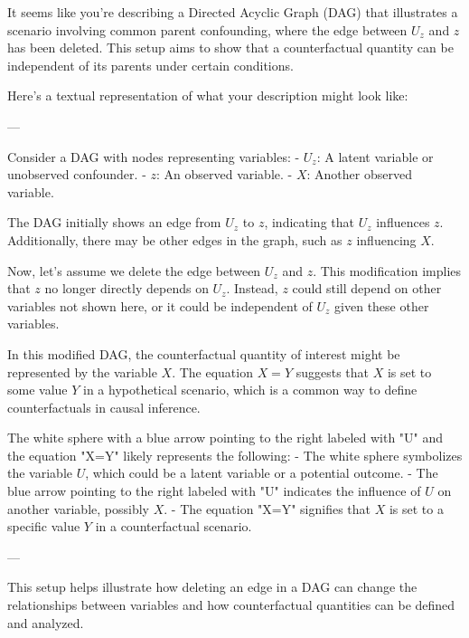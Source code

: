 It seems like you're describing a Directed Acyclic Graph (DAG) that illustrates a scenario involving common parent confounding, where the edge between \( U_z \) and \( z \) has been deleted. This setup aims to show that a counterfactual quantity can be independent of its parents under certain conditions.

Here's a textual representation of what your description might look like:

---

Consider a DAG with nodes representing variables:
- \( U_z \): A latent variable or unobserved confounder.
- \( z \): An observed variable.
- \( X \): Another observed variable.

The DAG initially shows an edge from \( U_z \) to \( z \), indicating that \( U_z \) influences \( z \). Additionally, there may be other edges in the graph, such as \( z \) influencing \( X \).

Now, let's assume we delete the edge between \( U_z \) and \( z \). This modification implies that \( z \) no longer directly depends on \( U_z \). Instead, \( z \) could still depend on other variables not shown here, or it could be independent of \( U_z \) given these other variables.

In this modified DAG, the counterfactual quantity of interest might be represented by the variable \( X \). The equation \( X = Y \) suggests that \( X \) is set to some value \( Y \) in a hypothetical scenario, which is a common way to define counterfactuals in causal inference.

The white sphere with a blue arrow pointing to the right labeled with "U" and the equation "X=Y" likely represents the following:
- The white sphere symbolizes the variable \( U \), which could be a latent variable or a potential outcome.
- The blue arrow pointing to the right labeled with "U" indicates the influence of \( U \) on another variable, possibly \( X \).
- The equation "X=Y" signifies that \( X \) is set to a specific value \( Y \) in a counterfactual scenario.

---

This setup helps illustrate how deleting an edge in a DAG can change the relationships between variables and how counterfactual quantities can be defined and analyzed.